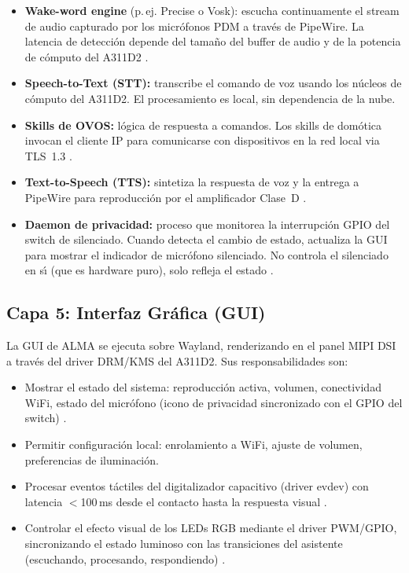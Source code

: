 \begin{itemize}
  \item \textbf{Wake-word engine} (p.\,ej. Precise o Vosk): escucha continuamente
    el stream de audio capturado por los micr\'{o}fonos PDM a trav\'{e}s de
    PipeWire. La latencia de detecci\'{o}n depende del tama\~{n}o del buffer
    de audio y de la potencia de c\'{o}mputo del A311D2 .
  \item \textbf{Speech-to-Text (STT):} transcribe el comando de voz usando
    los n\'{u}cleos de c\'{o}mputo del A311D2. El procesamiento es local,
    sin dependencia de la nube.
  \item \textbf{Skills de OVOS:} l\'{o}gica de respuesta a comandos.
    Los skills de dom\'{o}tica invocan el cliente IP para comunicarse con
    dispositivos en la red local via TLS~1.3 .
  \item \textbf{Text-to-Speech (TTS):} sintetiza la respuesta de voz y la
    entrega a PipeWire para reproducci\'{o}n por el amplificador Clase~D
    .
  \item \textbf{Daemon de privacidad:} proceso que monitorea la interrupci\'{o}n
    GPIO del switch de silenciado. Cuando detecta el cambio de estado, actualiza
    la GUI para mostrar el indicador de micr\'{o}fono silenciado. No controla
    el silenciado en s\'{\i} (que es hardware puro), solo refleja el estado
    .
\end{itemize}

\subsection{Capa 5: Interfaz Gr\'{a}fica (GUI)}

La GUI de ALMA se ejecuta sobre Wayland, renderizando en el panel MIPI DSI a
trav\'{e}s del driver DRM/KMS del A311D2. Sus responsabilidades son:

\begin{itemize}
  \item Mostrar el estado del sistema: reproducci\'{o}n activa, volumen,
    conectividad WiFi, estado del micr\'{o}fono (icono de privacidad
    sincronizado con el GPIO del switch) .
  \item Permitir configuraci\'{o}n local: enrolamiento a WiFi, ajuste de volumen,
    preferencias de iluminaci\'{o}n.
  \item Procesar eventos t\'{a}ctiles del digitalizador capacitivo (driver evdev)
    con latencia $<$100\,ms desde el contacto hasta la respuesta visual
    .
  \item Controlar el efecto visual de los LEDs RGB mediante el driver PWM/GPIO,
    sincronizando el estado luminoso con las transiciones del asistente
    (escuchando, procesando, respondiendo) .
\end{itemize}

